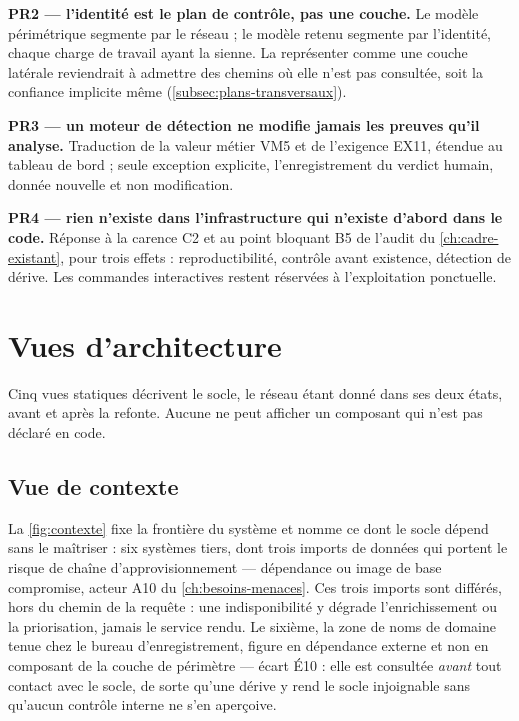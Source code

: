 \textbf{PR2 --- l'identité est le plan de contrôle, pas une couche.} Le modèle périmétrique segmente
par le réseau ; le modèle retenu segmente par l'identité, chaque charge de travail ayant la sienne.
La représenter comme une couche latérale reviendrait à admettre des chemins où elle n'est pas
consultée, soit la confiance implicite même (\cref{subsec:plans-transversaux}).

\textbf{PR3 --- un moteur de détection ne modifie jamais les preuves qu'il analyse.} Traduction de
la valeur métier VM5 et de l'exigence EX11, étendue au tableau de bord ; seule exception explicite,
l'enregistrement du verdict humain, donnée nouvelle et non modification.

\textbf{PR4 --- rien n'existe dans l'infrastructure qui n'existe d'abord dans le code.} Réponse à
la carence C2 et au point bloquant B5 de l'audit du \cref{ch:cadre-existant}, pour trois effets :
reproductibilité, contrôle avant existence, détection de dérive. Les commandes interactives restent
réservées à l'exploitation ponctuelle.

\section{Vues d'architecture}
\label{sec:vues-archi}

Cinq vues statiques décrivent le socle, le réseau étant donné dans ses deux états, avant et après
la refonte. Aucune ne peut afficher un composant qui n'est pas déclaré en code.

\subsection{Vue de contexte}

La \cref{fig:contexte} fixe la frontière du système et nomme ce dont le socle dépend sans le
maîtriser : six systèmes tiers, dont trois imports de données qui portent le risque de chaîne
d'approvisionnement --- dépendance ou image de base compromise, acteur A10 du \cref{ch:besoins-menaces}. Ces trois
imports sont différés, hors du chemin de la requête : une indisponibilité y dégrade
l'enrichissement ou la priorisation, jamais le service rendu. Le sixième, la zone de noms de
domaine tenue chez le bureau d'enregistrement, figure en dépendance externe et non en composant de
la couche de périmètre --- écart É10 : elle est consultée \emph{avant} tout contact avec le socle,
de sorte qu'une dérive y rend le socle injoignable sans qu'aucun contrôle interne ne s'en aperçoive.

